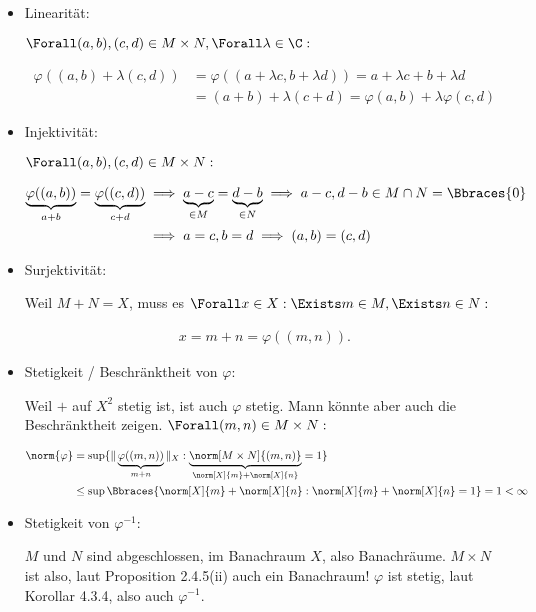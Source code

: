 \begin{solution}

\phantom{}

\begin{itemize}

  \item
  Linearität:

  $\Forall (a, b), (c, d) \in M \times N, \Forall \lambda \in \C:$

  \begin{align*}
    \varphi((a,b) + \lambda (c,d))
    & =
    \varphi ((a + \lambda c, b + \lambda d))
    =
    a + \lambda c + b + \lambda d \\
    & =
    (a + b) + \lambda (c + d)
    =
    \varphi (a, b) + \lambda \varphi (c, d)
  \end{align*}

  \item
  Injektivität:

  $\Forall (a, b), (c, d) \in M \times N:$

  \begin{align*}
    \underbrace{\varphi((a, b))}_{a + b}
    =
    \underbrace{\varphi((c, d))}_{c + d}
    & \implies
    \underbrace{a - c}_{\in M}
    =
    \underbrace{d - b}_{\in N}
    \implies
    a - c, d - b \in M \cap N = \Bbraces{0} \\
    & \implies
    a = c, b = d
    \implies
    (a, b) = (c, d)
  \end{align*}

  \item
  Surjektivität:

  Weil $M + N = X$, muss es $\Forall x \in X: \Exists m \in M, \Exists n \in N:$

  \begin{align*}
    x = m + n = \varphi((m, n)).
  \end{align*}

  \item
  Stetigkeit / Beschränktheit von $\varphi$:

  Weil $+$ auf $X^2$ stetig ist, ist auch $\varphi$ stetig.
  Mann könnte aber auch die Beschränktheit zeigen.
  $\Forall (m, n) \in M \times N:$

  \begin{align*}
    \norm{\varphi}
    & =
    \sup \{
      \| \underbrace{\varphi((m, n))}_{m + n} \|_X:
      \underbrace
      {
        \norm[M \times N]{(m, n)}
      }_{
        \norm[X]{m} + \norm[X]{n}
      } = 1
    \} \\
    & \leq
    \sup \Bbraces{
      \norm[X]{m} + \norm[X]{n}:
      \norm[X]{m} + \norm[X]{n} = 1
    }
    = 1 < \infty
  \end{align*}

  \item
  Stetigkeit von $\varphi^{-1}$:

  $M$ und $N$ sind abgeschlossen, im Banachraum $X$, also Banachräume.
  $M \times N$ ist also, laut Proposition 2.4.5(ii) auch ein Banachraum!
  $\varphi$ ist stetig, laut Korollar 4.3.4, also auch $\varphi^{-1}$.

 \end{itemize}

\end{solution}
